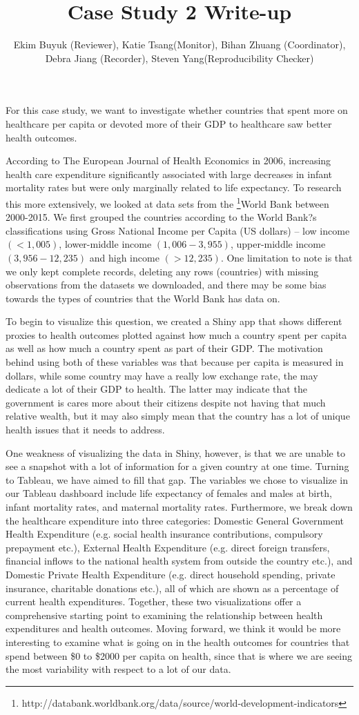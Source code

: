 \documentclass[11pt, oneside]{article}   	%
\title{Case Study 2 Write-up}
\author{Ekim Buyuk (Reviewer), Katie Tsang(Monitor), Bihan Zhuang (Coordinator),\\ Debra Jiang (Recorder), Steven Yang(Reproducibility Checker)}
\begin{document}
\maketitle
For this case study, we want to investigate whether countries that spent more on healthcare per capita or devoted more of their GDP to healthcare saw better health outcomes.

According to The European Journal of Health Economics in 2006, increasing health care expenditure significantly associated with large decreases in infant mortality rates but were only marginally related to life expectancy. To research this more extensively, we looked at data sets from the \footnote{http://databank.worldbank.org/data/source/world-development-indicators}{World Bank} between 2000-2015. We first grouped the countries according to the World Bank?s classifications using Gross National Income per Capita (US dollars) -- low income $(< 1,005)$, lower-middle income $(1,006 - 3,955)$, upper-middle income $(3,956 - 12,235)$ and high income $(>12,235)$. One limitation to note is that we only kept complete records, deleting any rows (countries) with missing observations from the datasets we downloaded, and there may be some bias towards the types of countries that the World Bank has data on. 

To begin to visualize this question, we created a Shiny app that shows different proxies to health outcomes plotted against how much a country spent per capita as well as how much a country spent as part of their GDP. The motivation behind using both of these variables was that because per capita is measured in dollars, while some country may have a really low exchange rate, the may dedicate a lot of their GDP to health. The latter may indicate that the government is cares more about their citizens despite not having that much relative wealth, but it may also simply mean that the country has a lot of unique health issues that it needs to address. 

One weakness of visualizing the data in Shiny, however, is that we are unable to see a snapshot with a lot of information for a given country at one time. Turning to Tableau, we have aimed to fill that gap. The variables we chose to visualize in our Tableau dashboard include life expectancy of females and males at birth, infant mortality rates, and maternal mortality rates. Furthermore, we break down the healthcare expenditure into three categories: Domestic General Government Health Expenditure (e.g. social health insurance contributions, compulsory prepayment etc.), External Health Expenditure (e.g. direct foreign transfers, financial inflows to the national health system from outside the country etc.), and Domestic Private Health Expenditure (e.g. direct household spending, private insurance, charitable donations etc.), all of which are shown as a percentage of current health expenditures. 
Together, these two visualizations offer a comprehensive starting point to examining the relationship between health expenditures and health outcomes. Moving forward, we think it would be more interesting to examine what is going on in the health outcomes for countries that spend between \$0 to \$2000 per capita on health, since that is where we are seeing the most variability with respect to a lot of our data.
\end{document}
